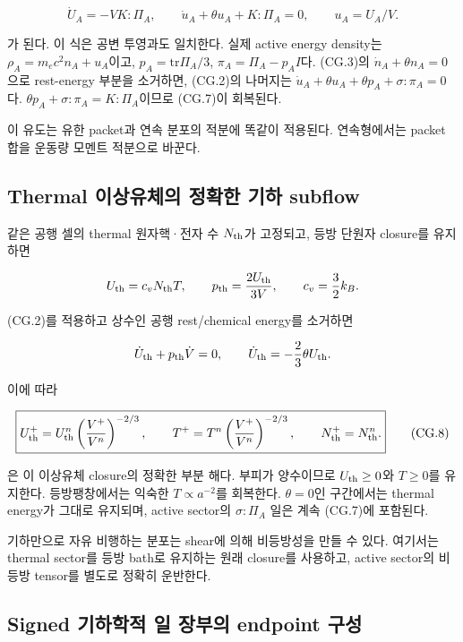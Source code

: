 \[
\boxed{
\dot U_A=-V K:\Pi_A,\qquad
\dot u_A+\theta u_A+K:\Pi_A=0,\qquad u_A=U_A/V.
}
\tag{CG.7}
\]

가 된다. 이 식은 공변 투영과도 일치한다. 실제 active energy density는 \(\rho_A=m_ec^2n_A+u_A\)이고, \(p_A=\mathrm{tr}\Pi_A/3\), \(\pi_A=\Pi_A-p_AI\)다. (CG.3)의 \(\dot n_A+\theta n_A=0\)으로 rest-energy 부분을 소거하면, (CG.2)의 나머지는 \(\dot u_A+\theta u_A+\theta p_A+\sigma:\pi_A=0\)다. \(\theta p_A+\sigma:\pi_A=K:\Pi_A\)이므로 (CG.7)이 회복된다.

이 유도는 유한 packet과 연속 분포의 적분에 똑같이 적용된다. 연속형에서는 packet 합을 운동량 모멘트 적분으로 바꾼다.

\hypertarget{thermal-uxc774uxc0c1uxc720uxccb4uxc758-uxc815uxd655uxd55c-uxae30uxd558-subflow}{%
\subsection{Thermal 이상유체의 정확한 기하 subflow}\label{thermal-uxc774uxc0c1uxc720uxccb4uxc758-uxc815uxd655uxd55c-uxae30uxd558-subflow}}

같은 공행 셀의 thermal 원자핵·전자 수 \(N_{\rm th}\)가 고정되고, 등방 단원자 closure를 유지하면

\[
U_{\rm th}=c_vN_{\rm th}T,\qquad
p_{\rm th}=\frac{2U_{\rm th}}{3V},\qquad c_v=\frac32k_B.
\]

(CG.2)를 적용하고 상수인 공행 rest/chemical energy를 소거하면

\[
\dot U_{\rm th}+p_{\rm th}\dot V=0,
\qquad
\dot U_{\rm th}=-\frac23\theta U_{\rm th}.
\]

이에 따라

\[
\boxed{
U_{\rm th}^{+}
=U_{\rm th}^{n}
\left(\frac{V^{+}}{V^n}\right)^{-2/3},
\qquad
T^{+}=T^n
\left(\frac{V^{+}}{V^n}\right)^{-2/3},
\qquad N_{\rm th}^{+}=N_{\rm th}^{n}.
}
\tag{CG.8}
\]

은 이 이상유체 closure의 정확한 부분 해다. 부피가 양수이므로 \(U_{\rm th}\ge0\)와 \(T\ge0\)를 유지한다. 등방팽창에서는 익숙한 \(T\propto a^{-2}\)를 회복한다. \(\theta=0\)인 구간에서는 thermal energy가 그대로 유지되며, active sector의 \(\sigma:\Pi_A\) 일은 계속 (CG.7)에 포함된다.

기하만으로 자유 비행하는 분포는 shear에 의해 비등방성을 만들 수 있다. 여기서는 thermal sector를 등방 bath로 유지하는 원래 closure를 사용하고, active sector의 비등방 tensor를 별도로 정확히 운반한다.

\hypertarget{signed-uxae30uxd558uxd559uxc801-uxc77c-uxc7a5uxbd80uxc758-endpoint-uxad6cuxc131}{%
\subsection{Signed 기하학적 일 장부의 endpoint 구성}\label{signed-uxae30uxd558uxd559uxc801-uxc77c-uxc7a5uxbd80uxc758-endpoint-uxad6cuxc131}}

